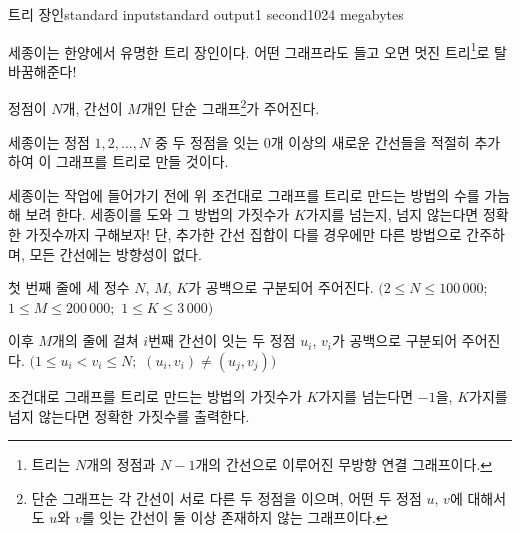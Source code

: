 \begin{problem}{트리 장인}{standard input}{standard output}{1 second}{1024 megabytes}

세종이는 한양에서 유명한 트리 장인이다. 어떤 그래프라도 들고 오면 멋진 트리\footnote{트리는 $N$개의 정점과 $N-1$개의 간선으로 이루어진 무방향 연결 그래프이다.}로 탈바꿈해준다!

정점이 $N$개, 간선이 $M$개인 단순 그래프\footnote{단순 그래프는 각 간선이 서로 다른 두 정점을 이으며, 어떤 두 정점 $u$, $v$에 대해서도 $u$와 $v$를 잇는 간선이 둘 이상 존재하지 않는 그래프이다.}가 주어진다.

세종이는 정점 $1, 2, \ldots, N$ 중 두 정점을 잇는 $0$개 이상의 새로운 간선들을 적절히 추가하여 이 그래프를 트리로 만들 것이다.

세종이는 작업에 들어가기 전에 위 조건대로 그래프를 트리로 만드는 방법의 수를 가늠해 보려 한다. 세종이를 도와 그 방법의 가짓수가 $K$가지를 넘는지, 넘지 않는다면 정확한 가짓수까지 구해보자! 단, 추가한 간선 집합이 다를 경우에만 다른 방법으로 간주하며, 모든 간선에는 방향성이 없다.

\InputFile
첫 번째 줄에 세 정수 $N$, $M$, $K$가 공백으로 구분되어 주어진다. $(2 \le N \le 100\, 000;$ $1 \le M \le 200\, 000;$ $1 \le K \le 3\, 000)$

이후 $M$개의 줄에 걸쳐 $i$번째 간선이 잇는 두 정점 $u_i$, $v_i$가 공백으로 구분되어 주어진다. $(1 \le u_i \lt v_i \le N;$ $(u_i, v_i) \ne (u_j, v_j) )$

\OutputFile
조건대로 그래프를 트리로 만드는 방법의 가짓수가 $K$가지를 넘는다면 $-1$을, $K$가지를 넘지 않는다면 정확한 가짓수를 출력한다.

\Examples

\begin{example}
%
%
\end{example}

\end{problem}

